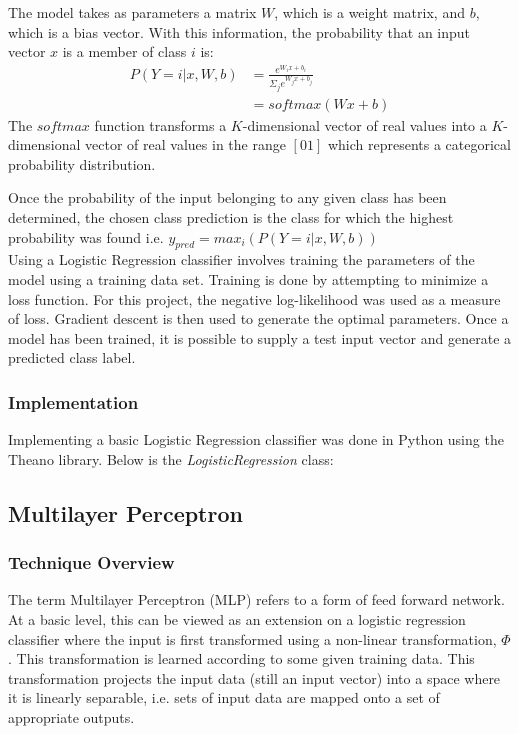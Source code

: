 \documentclass[12pt, titlepage]{article}
\begin{document}
  The model takes as parameters a matrix $W$, which is a weight matrix, and $b$, which is a bias vector. With this information, the probability that an input vector 
  $x$ is a member of class $i$ is: \\
  \begin{align*}
  P(Y=i|x,W,b) &= \frac{e^{W_{i}x + b_{i}}}{\Sigma_{j}e^{W_{j}x + b_{j}}} \\
               &= softmax(Wx+b)
  \end{align*}
  The $softmax$ function transforms a $K$-dimensional vector of real values into a $K$-dimensional vector of real values in the range $[0 1]$ which represents a
  categorical probability distribution.
  
  Once the probability of the input belonging to any given class has been determined, the chosen class prediction is the class for which the highest probability
  was found i.e. $y_{pred} = max_{i}(P(Y=i|x,W,b))$ \\
  
  Using a Logistic Regression classifier involves training the parameters of the model using a training data set. Training is done by attempting to minimize a loss
  function. For this project, the negative log-likelihood was used as a measure of loss. Gradient descent is then used to generate the optimal parameters. Once a 
  model has been trained, it is possible to supply a test input vector and generate a predicted class label.
  
  \subsubsection{Implementation}
  
  Implementing a basic Logistic Regression classifier was done in Python using the Theano library. Below is the 
  \textit{LogisticRegression} class:
  

\subsection{Multilayer Perceptron}
  \subsubsection{Technique Overview}
  
  The term Multilayer Perceptron (MLP) refers to a form of feed forward network. At a basic level, this can be viewed
  as an extension on a logistic regression classifier where the input is first transformed using a non-linear 
  transformation, $\Phi$. This transformation is learned according to some given training data. This transformation
  projects the input data (still an input vector) into a space where it is linearly separable, i.e. sets of input data are
  mapped onto a set of appropriate outputs.
  
\end{document}
